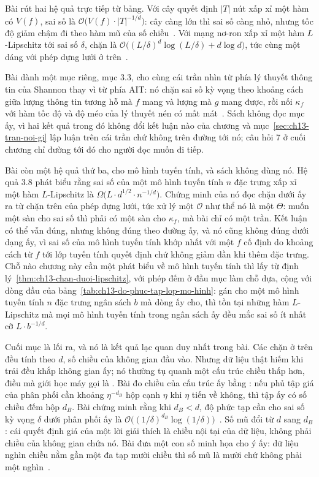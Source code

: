 Bài rút hai hệ quả trực tiếp từ bảng. Với cây quyết định $|T|$ nút xấp xỉ một
hàm có  $V(f)$, sai số là
$\mathcal{O}\big(V(f) \cdot |T|^{-1/d}\big)$: cây càng lớn thì sai số càng nhỏ,
nhưng tốc độ giảm chậm đi theo hàm mũ của số chiều~\autocite{p26limits}. Với
mạng nơ-ron xấp xỉ một hàm $L$-Lipschitz tới sai số $\delta$, chặn là
$\mathcal{O}\big((L/\delta)^d \log(L/\delta) + d \log d\big)$, tức cùng một dáng
với phép dựng lưới ở trên~\autocite{p26limits}.

Bài dành một mục riêng, mục 3.3, cho cùng cái trần nhìn từ phía lý thuyết thông
tin của Shannon thay vì từ phía AIT: nó chặn sai số kỳ vọng theo khoảng cách
giữa lượng thông tin tương hỗ mà $f$ mang và lượng mà $g$ mang được, rồi nối
$\kappa_f$ với hàm tốc độ và độ méo của lý thuyết nén có mất
mát~\autocite{p26limits}. Sách không đọc mục ấy, vì hai kết quả trong đó không
đổi kết luận nào của chương và mục~\ref{sec:ch13-tran-noi-gi} lập luận trên cái
trần chứ không trên đường tới nó; câu hỏi 7 ở cuối chương chỉ đường tới đó cho
người đọc muốn đi tiếp.

Bài còn một hệ quả thứ ba, cho mô hình tuyến tính, và sách không dùng nó. Hệ quả
3.8 phát biểu rằng sai số của một mô hình tuyến tính $n$ đặc trưng xấp xỉ một
hàm $L$-Lipschitz là $\Omega\big(L \cdot d^{1/2} \cdot n^{-1/d}\big)$. Chứng
minh của nó đọc chặn dưới ấy ra từ chặn trên của phép dựng lưới, tức xử lý một
$\mathcal{O}$ như thể nó là một $\Theta$: muốn một sàn cho sai số thì phải có
một sàn cho $\kappa_f$, mà bài chỉ có một trần. Kết luận có thể vẫn đúng, nhưng
không đúng theo đường ấy, và nó cũng không đúng dưới dạng ấy, vì sai số của mô
hình tuyến tính khớp nhất với một $f$ cố định do khoảng cách từ $f$ tới lớp
tuyến tính quyết định chứ không giảm dần khi thêm đặc trưng. Chỗ nào chương này
cần một phát biểu về mô hình tuyến tính thì lấy từ định
lý~\ref{thm:ch13-chan-duoi-lipschitz}, với phép đếm ở đầu mục làm chỗ dựa, cộng
với dòng đầu của bảng~\ref{tab:ch13-do-phuc-tap-lop-mo-hinh}: gán cho một mô
hình tuyến tính $n$ đặc trưng ngân sách $b$ mà dòng ấy cho, thì tồn tại những
hàm $L$-Lipschitz mà mọi mô hình tuyến tính trong ngân sách ấy đều mắc sai số ít
nhất cỡ $L \cdot b^{-1/d}$.

%
Cuối mục là lối ra, và nó là kết quả lạc quan duy nhất trong bài. Các chặn ở
trên đều tính theo $d$, số chiều của không gian đầu vào. Nhưng dữ liệu thật hiếm
khi trải đều khắp không gian ấy; nó thường tụ quanh một cấu trúc chiều thấp hơn,
điều mà giới học máy gọi là . Bài đo
chiều của cấu trúc ấy bằng : nếu
phủ tập giá của phân phối cần khoảng $\eta^{-d_B}$ hộp cạnh $\eta$ khi $\eta$
tiến về không, thì tập ấy có số chiều đếm hộp $d_B$. Bài chứng minh rằng khi
$d_B < d$, độ phức tạp cần cho sai số kỳ vọng $\delta$ dưới phân phối ấy là
$\mathcal{O}\big((1/\delta)^{d_B} \log(1/\delta)\big)$~\autocite{p26limits}. Số
mũ đổi từ $d$ sang $d_B$: cái quyết định giá của một lời giải thích là chiều nội
tại của dữ liệu, không phải chiều của không gian chứa nó. Bài đưa một con số
minh họa cho ý ấy: dữ liệu nghìn chiều nằm gần một đa tạp mười chiều thì số mũ
là mười chứ không phải một nghìn~\autocite{p26limits}.

%
